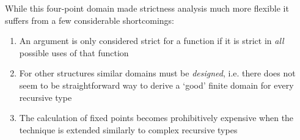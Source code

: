While this four-point domain made strictness analysis much more flexible it
suffers from a few considerable shortcomings:

\begin{enumerate}
    \item An argument is only considered strict for a function if it is strict
        in \emph{all} possible uses of that function
    \item For other structures similar domains must be \emph{designed}, i.e.
        there does not seem to be straightforward way to derive a `good' finite
        domain for every recursive type
    \item The calculation of fixed points becomes prohibitively expensive when
        the technique is extended similarly to complex recursive types
\end{enumerate}
